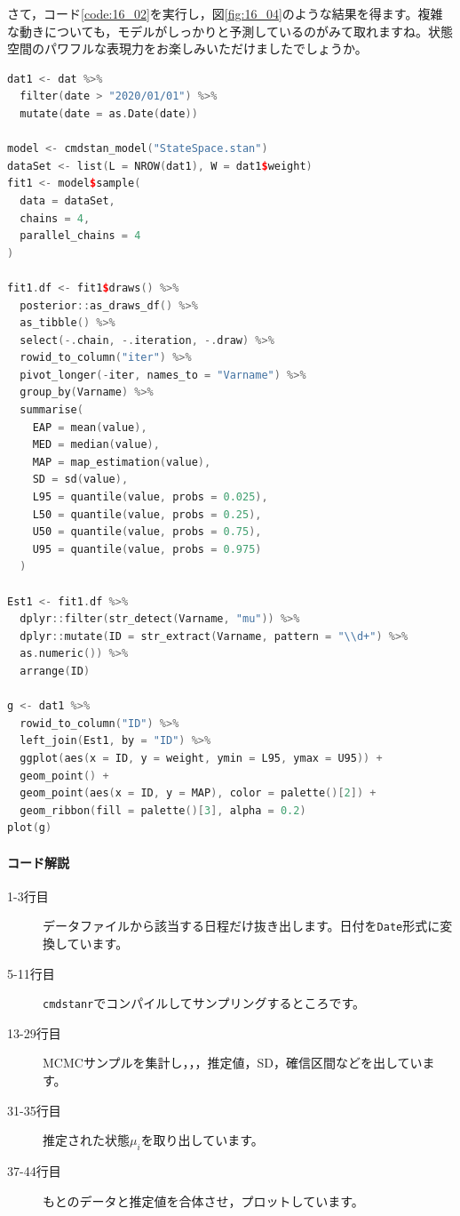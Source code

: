 \documentclass{ltjsbook}
\begin{document}
さて，コード\ref{code:16_02}を実行し，図\ref{fig:16_04}のような結果を得ます。複雑な動きについても，モデルがしっかりと予測しているのがみて取れますね。状態空間のパワフルな表現力をお楽しみいただけましたでしょうか。
\begin{lstlisting}[language=c++,label={code:16_02},caption={状態空間モデルのコード}]
dat1 <- dat %>%
  filter(date > "2020/01/01") %>%
  mutate(date = as.Date(date))

model <- cmdstan_model("StateSpace.stan")
dataSet <- list(L = NROW(dat1), W = dat1$weight)
fit1 <- model$sample(
  data = dataSet,
  chains = 4,
  parallel_chains = 4
)

fit1.df <- fit1$draws() %>%
  posterior::as_draws_df() %>%
  as_tibble() %>%
  select(-.chain, -.iteration, -.draw) %>%
  rowid_to_column("iter") %>%
  pivot_longer(-iter, names_to = "Varname") %>%
  group_by(Varname) %>%
  summarise(
    EAP = mean(value),
    MED = median(value),
    MAP = map_estimation(value),
    SD = sd(value),
    L95 = quantile(value, probs = 0.025),
    L50 = quantile(value, probs = 0.25),
    U50 = quantile(value, probs = 0.75),
    U95 = quantile(value, probs = 0.975)
  )

Est1 <- fit1.df %>%
  dplyr::filter(str_detect(Varname, "mu")) %>%
  dplyr::mutate(ID = str_extract(Varname, pattern = "\\d+") %>% 
  as.numeric()) %>%
  arrange(ID)

g <- dat1 %>%
  rowid_to_column("ID") %>%
  left_join(Est1, by = "ID") %>%
  ggplot(aes(x = ID, y = weight, ymin = L95, ymax = U95)) +
  geom_point() +
  geom_point(aes(x = ID, y = MAP), color = palette()[2]) +
  geom_ribbon(fill = palette()[3], alpha = 0.2)
plot(g)
\end{lstlisting}
\paragraph{コード解説}
\begin{description}
	\item[1-3行目] データファイルから該当する日程だけ抜き出します。日付を\verb|Date|形式に変換しています。
	\item[5-11行目] \verb|cmdstanr|でコンパイルしてサンプリングするところです。
	\item[13-29行目] MCMCサンプルを集計し，，，推定値，SD，確信区間などを出しています。
	\item[31-35行目] 推定された状態$\mu_i$を取り出しています。
	\item[37-44行目] もとのデータと推定値を合体させ，プロットしています。
\end{description}
\end{document}

